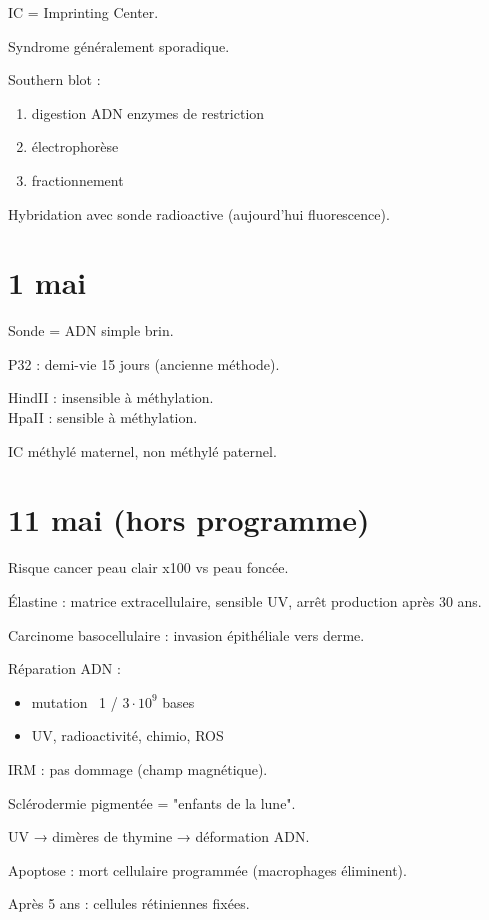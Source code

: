 \documentclass[11pt]{article}
\begin{document}
IC = Imprinting Center.

\vspace{0.3cm}

Syndrome généralement sporadique.

\vspace{0.3cm}

Southern blot :
\begin{enumerate}
    \item digestion ADN enzymes de restriction
    \item électrophorèse
    \item fractionnement
\end{enumerate}

Hybridation avec sonde radioactive (aujourd'hui fluorescence).

\section*{1 mai}

Sonde = ADN simple brin.

P32 : demi-vie 15 jours (ancienne méthode).

HindII : insensible à méthylation.\\
HpaII : sensible à méthylation.

IC méthylé maternel, non méthylé paternel.

\vspace{0.3cm}

\section*{11 mai (hors programme)}

Risque cancer peau clair x100 vs peau foncée.

Élastine : matrice extracellulaire, sensible UV, arrêt production après 30 ans.

Carcinome basocellulaire : invasion épithéliale vers derme.

\vspace{0.3cm}

Réparation ADN :
\begin{itemize}
    \item mutation ~1 / $3 \cdot 10^9$ bases
    \item UV, radioactivité, chimio, ROS
\end{itemize}

IRM : pas dommage (champ magnétique).

\vspace{0.3cm}

Sclérodermie pigmentée = "enfants de la lune".

UV → dimères de thymine → déformation ADN.

Apoptose : mort cellulaire programmée (macrophages éliminent).

Après 5 ans : cellules rétiniennes fixées.
\end{document}
